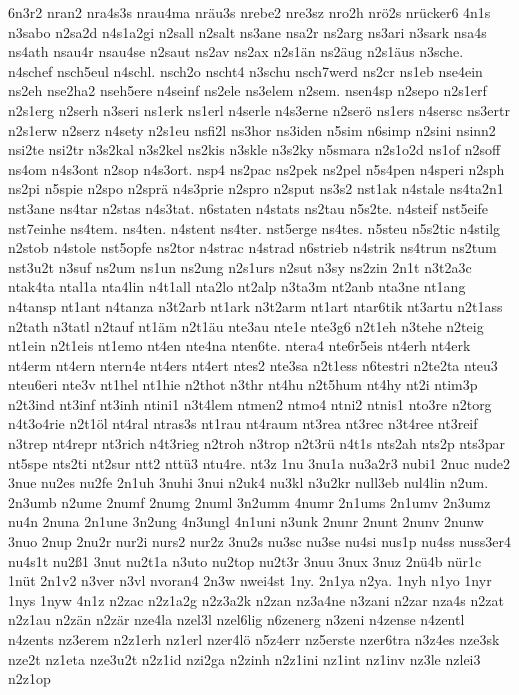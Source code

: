 {6n3r2
nran2
nra4s3s
nrau4ma
nräu3s
nrebe2
nre3sz
nro2h
nrö2s
nrücker6
4n1s
n3sabo
n2sa2d
n4s1a2gi
n2sall
n2salt
ns3ane
nsa2r
ns2arg
ns3ari
n3sark
nsa4s
ns4ath
nsau4r
nsau4se
n2saut
ns2av
ns2ax
n2s1än
ns2äug
n2s1äus
n3sche.
n4schef
nsch5eul
n4schl.
nsch2o
nscht4
n3schu
nsch7werd
ns2cr
ns1eb
nse4ein
ns2eh
nse2ha2
nseh5ere
n4seinf
ns2ele
ns3elem
n2sem.
nsen4sp
n2sepo
n2s1erf
n2s1erg
n2serh
n3seri
ns1erk
ns1erl
n4serle
n4s3erne
n2serö
ns1ers
n4sersc
ns3ertr
n2s1erw
n2serz
n4sety
n2s1eu
nsfi2l
ns3hor
ns3iden
n5sim
n6simp
n2sini
nsinn2
nsi2te
nsi2tr
n3s2kal
n3s2kel
ns2kis
n3skle
n3s2ky
n5smara
n2s1o2d
ns1of
n2soff
ns4om
n4s3ont
n2sop
n4s3ort.
nsp4
ns2pac
ns2pek
ns2pel
n5s4pen
n4speri
n2sph
ns2pi
n5spie
n2spo
n2sprä
n4s3prie
n2spro
n2sput
ns3s2
nst1ak
n4stale
ns4ta2n1
nst3ane
ns4tar
n2stas
n4s3tat.
n6staten
n4stats
ns2tau
n5s2te.
n4steif
nst5eife
nst7einhe
ns4tem.
ns4ten.
n4stent
ns4ter.
nst5erge
ns4tes.
n5steu
n5s2tic
n4stilg
n2stob
n4stole
nst5opfe
ns2tor
n4strac
n4strad
n6strieb
n4strik
ns4trun
ns2tum
nst3u2t
n3suf
ns2um
ns1un
ns2ung
n2s1urs
n2sut
n3sy
ns2zin
2n1t
n3t2a3c
ntak4ta
ntal1a
nta4lin
n4t1all
nta2lo
nt2alp
n3ta3m
nt2anb
nta3ne
nt1ang
n4tansp
nt1ant
n4tanza
n3t2arb
nt1ark
n3t2arm
nt1art
ntar6tik
nt3artu
n2t1ass
n2tath
n3tatl
n2tauf
nt1äm
n2t1äu
nte3au
nte1e
nte3g6
n2t1eh
n3tehe
n2teig
nt1ein
n2t1eis
nt1emo
nt4en
nte4na
nten6te.
ntera4
nte6r5eis
nt4erh
nt4erk
nt4erm
nt4ern
ntern4e
nt4ers
nt4ert
ntes2
nte3sa
n2t1ess
n6testri
n2te2ta
nteu3
nteu6eri
nte3v
nt1hel
nt1hie
n2thot
n3thr
nt4hu
n2t5hum
nt4hy
nt2i
ntim3p
n2t3ind
nt3inf
nt3inh
ntini1
n3t4lem
ntmen2
ntmo4
ntni2
ntnis1
nto3re
n2torg
n4t3o4rie
n2t1öl
nt4ral
ntras3s
nt1rau
nt4raum
nt3rea
nt3rec
n3t4ree
nt3reif
n3trep
nt4repr
nt3rich
n4t3rieg
n2troh
n3trop
n2t3rü
n4t1s
nts2ah
nts2p
nts3par
nt5spe
nts2ti
nt2sur
ntt2
nttü3
ntu4re.
nt3z
1nu
3nu1a
nu3a2r3
nubi1
2nuc
nude2
3nue
nu2es
nu2fe
2n1uh
3nuhi
3nui
n2uk4
nu3kl
n3u2kr
null3eb
nul4lin
n2um.
2n3umb
n2ume
2numf
2numg
2numl
3n2umm
4numr
2n1ums
2n1umv
2n3umz
nu4n
2nuna
2n1une
3n2ung
4n3ungl
4n1uni
n3unk
2nunr
2nunt
2nunv
2nunw
3nuo
2nup
2nu2r
nur2i
nurs2
nur2z
3nu2s
nu3sc
nu3se
nu4si
nus1p
nu4ss
nuss3er4
nu4s1t
nu2ß1
3nut
nu2t1a
n3uto
nu2top
nu2t3r
3nuu
3nux
3nuz
2nü4b
nür1c
1nüt
2n1v2
n3ver
n3vl
nvoran4
2n3w
nwei4st
1ny.
2n1ya
n2ya.
1nyh
n1yo
1nyr
1nys
1nyw
4n1z
n2zac
n2z1a2g
n2z3a2k
n2zan
nz3a4ne
n3zani
n2zar
nza4s
n2zat
n2z1au
n2zän
n2zär
nze4la
nzel3l
nzel6lig
n6zenerg
n3zeni
n4zense
n4zentl
n4zents
nz3erem
n2z1erh
nz1erl
nzer4lö
n5z4err
nz5erste
nzer6tra
n3z4es
nze3sk
nze2t
nz1eta
nze3u2t
n2z1id
nzi2ga
n2zinh
n2z1ini
nz1int
nz1inv
nz3le
nzlei3
n2z1op
}
